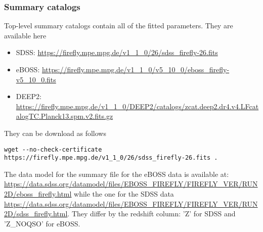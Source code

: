 \documentclass[onecolumn]{aa}
\begin{document}
% 

\subsubsection{Summary catalogs}
Top-level summary catalogs contain all of the fitted parameters. They are available here 
\begin{itemize}
\item SDSS: \url{https://firefly.mpe.mpg.de/v1_1_0/26/sdss_firefly-26.fits}
\item eBOSS: \url{https://firefly.mpe.mpg.de/v1_1_0/v5_10_0/eboss_firefly-v5_10_0.fits}
\item DEEP2: \url{https://firefly.mpe.mpg.de/v1_1_0/DEEP2/catalogs/zcat.deep2.dr4.v4.LFcatalogTC.Planck13.spm.v2.fits.gz}
\end{itemize}
They can be download as follows
\begin{verbatim}
wget --no-check-certificate https://firefly.mpe.mpg.de/v1_1_0/26/sdss_firefly-26.fits .
\end{verbatim}

The data model for the summary file for the eBOSS data is available at: 
\url{https://data.sdss.org/datamodel/files/EBOSS_FIREFLY/FIREFLY_VER/RUN2D/eboss_firefly.html} while the one for the SDSS data \url{https://data.sdss.org/datamodel/files/EBOSS_FIREFLY/FIREFLY_VER/RUN2D/sdss_firefly.html}.
They differ by the redshift column: 'Z' for SDSS and 'Z\_NOQSO' for eBOSS.  
\end{document}
